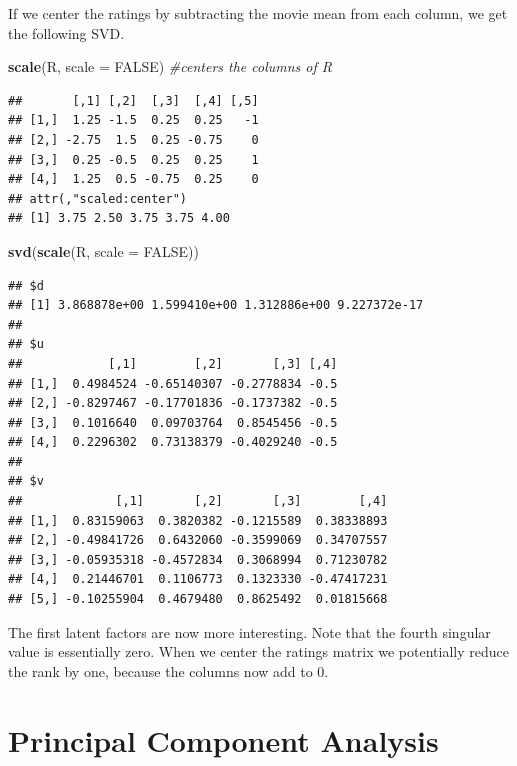\documentclass[
]{book}
\newenvironment{Shaded}{\begin{snugshade}}{\end{snugshade}}
\newcommand{\AttributeTok}[1]{\textcolor[rgb]{0.13,0.29,0.53}{#1}}
\newcommand{\CommentTok}[1]{\textcolor[rgb]{0.56,0.35,0.01}{\textit{#1}}}
\newcommand{\ConstantTok}[1]{\textcolor[rgb]{0.56,0.35,0.01}{#1}}
\newcommand{\FunctionTok}[1]{\textcolor[rgb]{0.13,0.29,0.53}{\textbf{#1}}}
\newcommand{\NormalTok}[1]{#1}
\theoremstyle{definition}
\theoremstyle{definition}
\theoremstyle{definition}
\theoremstyle{definition}
\theoremstyle{remark}
\begin{document}
If we center the ratings by subtracting the movie mean from each column, we get the following SVD.

\begin{Shaded}
\begin{Highlighting}[]
\FunctionTok{scale}\NormalTok{(R, }\AttributeTok{scale =} \ConstantTok{FALSE}\NormalTok{) }\CommentTok{\#centers the columns of R}
\end{Highlighting}
\end{Shaded}

\begin{verbatim}
##       [,1] [,2]  [,3]  [,4] [,5]
## [1,]  1.25 -1.5  0.25  0.25   -1
## [2,] -2.75  1.5  0.25 -0.75    0
## [3,]  0.25 -0.5  0.25  0.25    1
## [4,]  1.25  0.5 -0.75  0.25    0
## attr(,"scaled:center")
## [1] 3.75 2.50 3.75 3.75 4.00
\end{verbatim}

\begin{Shaded}
\begin{Highlighting}[]
\FunctionTok{svd}\NormalTok{(}\FunctionTok{scale}\NormalTok{(R, }\AttributeTok{scale =} \ConstantTok{FALSE}\NormalTok{))}
\end{Highlighting}
\end{Shaded}

\begin{verbatim}
## $d
## [1] 3.868878e+00 1.599410e+00 1.312886e+00 9.227372e-17
## 
## $u
##            [,1]        [,2]       [,3] [,4]
## [1,]  0.4984524 -0.65140307 -0.2778834 -0.5
## [2,] -0.8297467 -0.17701836 -0.1737382 -0.5
## [3,]  0.1016640  0.09703764  0.8545456 -0.5
## [4,]  0.2296302  0.73138379 -0.4029240 -0.5
## 
## $v
##             [,1]       [,2]       [,3]        [,4]
## [1,]  0.83159063  0.3820382 -0.1215589  0.38338893
## [2,] -0.49841726  0.6432060 -0.3599069  0.34707557
## [3,] -0.05935318 -0.4572834  0.3068994  0.71230782
## [4,]  0.21446701  0.1106773  0.1323330 -0.47417231
## [5,] -0.10255904  0.4679480  0.8625492  0.01815668
\end{verbatim}

The first latent factors are now more interesting. Note that the fourth singular value is essentially zero. When we center the ratings matrix we potentially reduce the rank by one, because the columns now add to 0.

\section{Principal Component Analysis}\label{principal-component-analysis}
\end{document}
